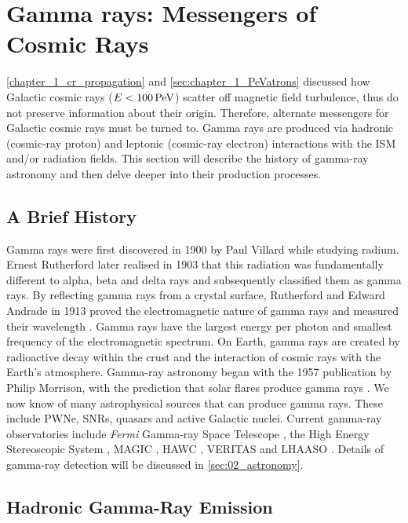 \section{Gamma rays: Messengers of Cosmic Rays} \label
{sec:chapter1_non_thermal_emission}
\autoref{chapter_1_cr_propagation} and \autoref{sec:chapter_1_PeVatrons} discussed how Galactic cosmic rays ($E<100\,\PeV$) scatter off magnetic field turbulence, thus do not preserve information about their origin. Therefore, alternate messengers for Galactic cosmic rays must be turned to. Gamma rays are produced via hadronic (cosmic-ray proton) and leptonic (cosmic-ray electron) interactions with the ISM and/or radiation fields. This section will describe the history of gamma-ray astronomy and then delve deeper into their production processes.

\subsection{A Brief History}

Gamma rays were first discovered in 1900 by Paul Villard while studying radium. Ernest Rutherford later realised in 1903 that this radiation was fundamentally different to alpha, beta and delta rays and subsequently classified them as gamma rays. By reflecting gamma rays from a crystal surface, Rutherford and Edward Andrade in 1913 proved the electromagnetic nature of gamma rays and measured their wavelength \citep{1913Natur..92..267R}. Gamma rays have the largest energy per photon and smallest frequency of the electromagnetic spectrum. On Earth, gamma rays are created by radioactive decay within the crust and the interaction of cosmic rays with the Earth's atmosphere. Gamma-ray astronomy began with the 1957 publication by Philip Morrison, with the prediction that solar flares produce gamma rays \citep{1958NCim....7..858M}. We now know of many astrophysical sources that can produce gamma rays. These include PWNe, SNRs, quasars and active Galactic nuclei. Current gamma-ray observatories include \textit{Fermi} Gamma-ray Space Telescope \citep{nasa_fermi_site}, the High Energy Stereoscopic System \citep{HESS}, MAGIC \citep{MAGIC}, HAWC \citep{HAWC}, VERITAS \citep{VERITAS} and LHAASO \citep{LHAASO_website}. Details of gamma-ray detection will be discussed in \autoref{sec:02_astronomy}.

\subsection{Hadronic Gamma-Ray Emission} \label{sec:chapter1_hadronic_gr_emission}

